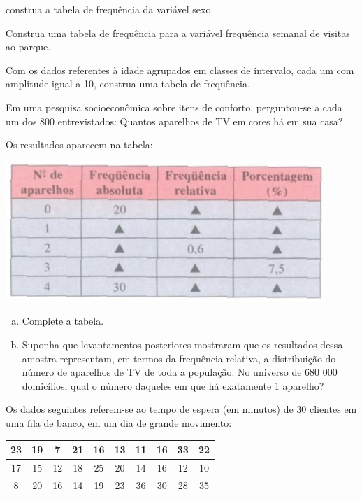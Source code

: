 	\item construa a tabela de frequência da variável sexo.
	
	\item Construa uma tabela de frequência para a variável frequência semanal de visitas ao parque.

	\item Com os dados referentes à idade agrupados em classes de intervalo, cada um com amplitude igual a 10, construa uma tabela de frequência.
	
	\item Em uma pesquisa socioeconômica sobre itens de conforto, perguntou-se a cada um dos 800 entrevistados: Quantos aparelhos de TV em cores há em sua casa?
	
	Os resultados aparecem na tabela:
	
	\begin{center}
		\includegraphics[scale=0.7]{figuras/fig105.png}
	\end{center}
	
	\begin{enumerate}[a)]
		\item Complete a tabela.
		\item Suponha que levantamentos posteriores mostraram que os resultados dessa amostra representam, em termos da frequência relativa, a distribuição do número de aparelhos de TV de toda a população. No universo de 680 000 domicílios, qual o número daqueles em que há exatamente 1 aparelho?
	\end{enumerate}
	
	\item Os dados seguintes referem-se ao tempo de espera (em minutos) de 30 clientes em uma fila de banco, em um dia de grande movimento:
	
	\begin{center}
	\begin{tabular}{cccccccccc}
	\hline 
	23 & 19 & 7 & 21 & 16 & 13 & 11 & 16 & 33 & 22 \\ 
	\hline 
	17 & 15 & 12 & 18 & 25 & 20 & 14 & 16 & 12 & 10 \\ 
	\hline 
	8 & 20 & 16 & 14 & 19 & 23 & 36 & 30 & 28 & 35 \\ 
	\hline 
	\end{tabular} 
	\end{center}
	
